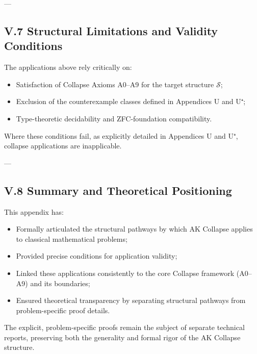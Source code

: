 \documentclass[11pt]{article}
\begin{document}
---

\subsection*{V.7 Structural Limitations and Validity Conditions}

The applications above rely critically on:

\begin{itemize}
    \item Satisfaction of Collapse Axioms A0–A9 for the target structure $\mathcal{S}$;
    \item Exclusion of the counterexample classes defined in Appendices U and U⁺;
    \item Type-theoretic decidability and ZFC-foundation compatibility.
\end{itemize}

Where these conditions fail, as explicitly detailed in Appendices U and U⁺, collapse applications are inapplicable.

---

\subsection*{V.8 Summary and Theoretical Positioning}

This appendix has:

\begin{itemize}
    \item Formally articulated the structural pathways by which AK Collapse applies to classical mathematical problems;
    \item Provided precise conditions for application validity;
    \item Linked these applications consistently to the core Collapse framework (A0–A9) and its boundaries;
    \item Ensured theoretical transparency by separating structural pathways from problem-specific proof details.
\end{itemize}

The explicit, problem-specific proofs remain the subject of separate technical reports, preserving both the generality and formal rigor of the AK Collapse structure.



\end{document}
